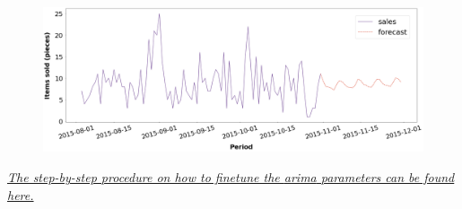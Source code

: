 \begin{figure}[h]
  \centering
  \includegraphics[width=0.88\linewidth]{external_content/graphs/final_arima_forecast.png}
  \captionsetup{justification=centering}
  \label{fig:arima_forecast}
\end{figure}

\vspace*{-8mm}
\begin{center}
\textit{\href{\finalARIMAurl}{The step-by-step procedure on how to finetune the \acrshort{arima} parameters can be found here.}}
\end{center}
